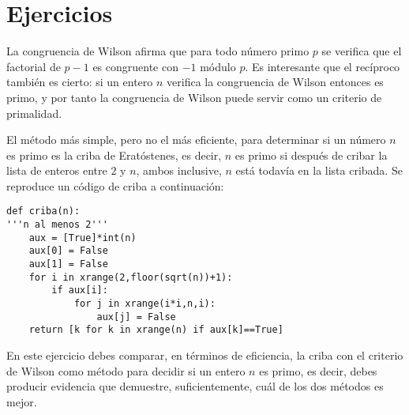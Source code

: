 \section{Ejercicios}

\begin{ejer}
La congruencia de Wilson afirma que para todo número primo $p$ se verifica que el factorial de $p-1$ es congruente con $-1$ módulo $p$. Es interesante que el recíproco también es cierto: si un entero $n$ verifica la congruencia de Wilson entonces es primo, y por tanto la congruencia de Wilson puede servir como un criterio de primalidad.

El método más simple, pero no el más eficiente,  para determinar si un número $n$ es primo es la criba de Eratóstenes, es decir,  $n$ es primo si después de cribar la lista de enteros entre $2$ y $n$, ambos inclusive, $n$ está todavía en la lista cribada. Se reproduce un c\'odigo de criba a continuaci\'on:  

\begin{lstlisting}
def criba(n):
'''n al menos 2'''
	aux = [True]*int(n)
	aux[0] = False
	aux[1] = False
	for i in xrange(2,floor(sqrt(n))+1):
		if aux[i]:
			for j in xrange(i*i,n,i):
				aux[j] = False
	return [k for k in xrange(n) if aux[k]==True]
\end{lstlisting}	





En este ejercicio debes comparar, en términos de eficiencia,  la criba con el criterio de Wilson como método para decidir si un entero $n$ es primo, es decir, debes producir  evidencia que demuestre, suficientemente, cuál de los dos métodos es mejor.	
	\end{ejer}
	
